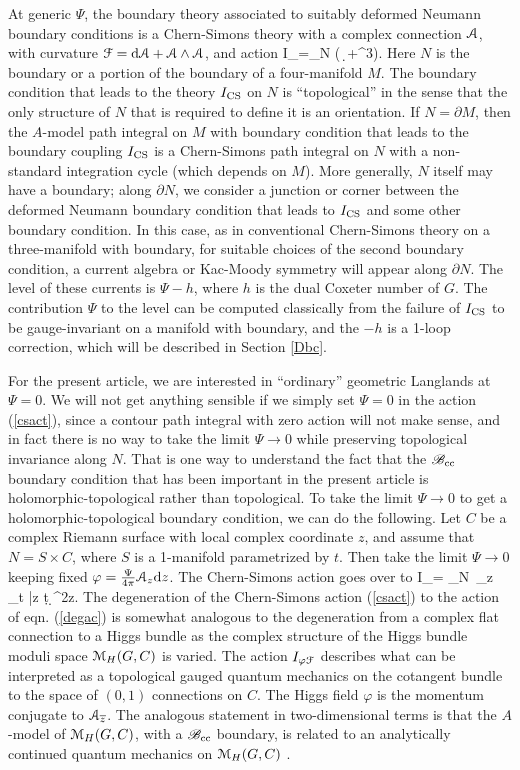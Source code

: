 \documentclass[11pt,a4paper]{article}
\begin{document}
At generic $\Psi$, the boundary theory associated to suitably deformed Neumann boundary conditions is a Chern-Simons theory with a complex
connection ${\mathcal A}$, with curvature ${\mathcal F}=\mathrm d {\mathcal A}+{\mathcal A}\wedge {\mathcal A}$, and  action
\be\label{csact} I_\CS =\frac{\Psi}{4\pi}\int_N \left( \Tr\,\cA\wedge \d \cA +\cA^3\right). \ee
Here $N$ is the boundary or a portion of the boundary of a four-manifold $M$.    The boundary condition that leads to the theory $I_{\mathrm{CS}}$ on $N$ is
``topological'' in the sense that the only structure of $N$ that is required to define it is an orientation.   If $N=\partial M$, then the $A$-model path integral
on $M$ with boundary condition that leads to the boundary coupling $I_{\mathrm{CS}}$ is a Chern-Simons path integral on $N$ with a non-standard integration cycle (which depends on $M$).
More generally, $N$ itself may have a boundary; along $\partial N$, we consider a junction or corner between the deformed Neumann boundary condition that leads
to $I_{\mathrm{CS}}$ and some other boundary condition.   In this case, as in conventional Chern-Simons theory on a three-manifold with boundary, for suitable
choices of the second boundary condition,  a current algebra or Kac-Moody symmetry will appear along $\partial N$.   The level of these currents is $\Psi-h$, where $h$ is the dual Coxeter number of $G$.
The contribution $\Psi$ to the level can be computed classically from the failure of $I_{\mathrm{CS}}$ to be gauge-invariant on a manifold with boundary, and the $-h$ is a 1-loop correction, which will be described in Section \ref{Dbc}.

For the present article, we are interested in ``ordinary'' geometric Langlands at $\Psi=0$.   We will not get anything sensible if we simply set $\Psi=0$
in the action (\ref{csact}), since a contour path integral with zero action will not make sense,
and in fact there is no way to take the limit $\Psi\to 0$ while preserving topological invariance along $N$.   That is one way
to understand the fact that the ${\mathscr B}_{\mathrm{cc}}$ boundary condition that has been important in the present article is holomorphic-topological rather than
topological.   To take the limit $\Psi\to 0$ to get a holomorphic-topological boundary condition, we can do the following.  Let $C$ be a complex Riemann
surface with local complex coordinate $z$,  and assume that $N=S\times C$, where $S$ is a 1-manifold parametrized by $t$.
Then take the limit $\Psi\to 0$ keeping fixed $\varphi=\frac{\Psi}{4\pi} {\mathcal A}_z\mathrm d z$.
The Chern-Simons action goes over to 
\be\label{degac}
I_{\varphi\cF}= 
\int _N\Tr\, \varphi_z \cF_{t \bar z} \d t \d^2z.
\ee
The degeneration of the Chern-Simons action (\ref{csact}) to the action of eqn. (\ref{degac}) is somewhat analogous to the degeneration from a complex
flat connection to a Higgs bundle as the complex structure of the Higgs bundle moduli space ${\mathcal M}_H(G,C)$ is varied.
The action $I_{\varphi{\mathcal F}} $ describes what can be interpreted as a topological gauged quantum mechanics on the cotangent bundle to the space of $(0,1)$ connections on $C$. 
The Higgs field $\varphi$ is the momentum conjugate to ${\mathcal A}_{\overline z}$. The analogous statement in two-dimensional terms
is that the $A$-model of ${\mathcal M}_H(G,C)$, with a ${\mathscr B}_{\mathrm{cc}}$ boundary, is related to 
an analytically continued  quantum mechanics on 
${\mathcal M}_H(G,C)$   \cite{Witten:2010zr}.
\end{document}
